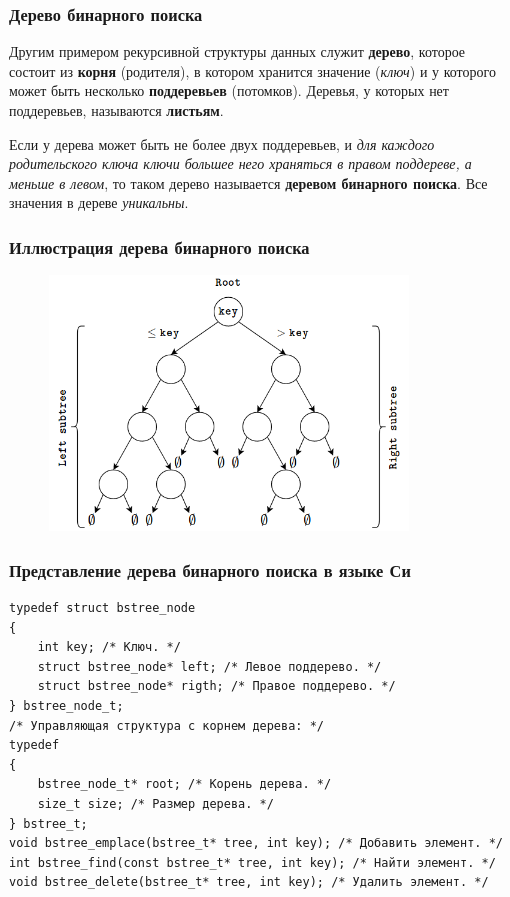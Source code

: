 \documentclass{beamer}
\begin{document}
    \begin{frame}[fragile]
        \frametitle{Дерево бинарного поиска}
        \justifying
        Другим примером рекурсивной структуры данных служит {\bf дерево}, которое состоит из {\bf корня} (родителя), в котором хранится значение ({\it ключ}) и у которого может быть несколько {\bf поддеревьев} (потомков). Деревья, у которых нет поддеревьев, называются {\bf листьям}.
        \par
        \vspace{0.5cm}
        \par
        \justifying
        Если у дерева может быть не более двух поддеревьев, и {\it для каждого родительского ключа ключи большее него храняться в правом поддереве, а меньше в левом}, то таком дерево называется {\bf деревом бинарного поиска}. Все значения в дереве {\it уникальны}.
    \end{frame}
    \begin{frame}[fragile]
        \frametitle{Иллюстрация дерева бинарного поиска}
        \begin{figure}[!tbp]
           \centering
           \includegraphics[width=0.85\textwidth]{pics/tree.png}
        \end{figure}
    \end{frame}
    \begin{frame}[fragile]
        \frametitle{Представление дерева бинарного поиска в языке Си}
        \begin{verbatim}
typedef struct bstree_node
{
    int key; /* Ключ. */
    struct bstree_node* left; /* Левое поддерево. */
    struct bstree_node* rigth; /* Правое поддерево. */
} bstree_node_t;
/* Управляющая структура с корнем дерева: */
typedef 
{
    bstree_node_t* root; /* Корень дерева. */
    size_t size; /* Размер дерева. */
} bstree_t;
void bstree_emplace(bstree_t* tree, int key); /* Добавить элемент. */
int bstree_find(const bstree_t* tree, int key); /* Найти элемент. */
void bstree_delete(bstree_t* tree, int key); /* Удалить элемент. */
        \end{verbatim}
    \end{frame}
\end{document}
